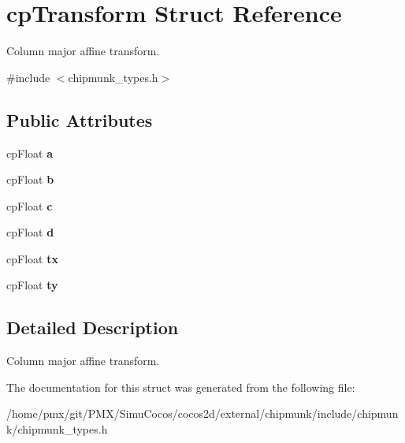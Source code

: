 \hypertarget{structcpTransform}{}\section{cp\+Transform Struct Reference}
\label{structcpTransform}


Column major affine transform.  




{\ttfamily \#include $<$chipmunk\+\_\+types.\+h$>$}

\subsection*{Public Attributes}
\begin{DoxyCompactItemize}
\item 
\mbox{\label{structcpTransform_a99065fbbead0a1df742987d5236f9fa0}} 
cp\+Float {\bfseries a}
\item 
\mbox{\label{structcpTransform_a86126f0cf307529a7faab06f7356a698}} 
cp\+Float {\bfseries b}
\item 
\mbox{\label{structcpTransform_ab0da955529cd2c48fe0aca3d4ff239a7}} 
cp\+Float {\bfseries c}
\item 
\mbox{\label{structcpTransform_a9ad9383b2b2d39d419cb9434f3d761b2}} 
cp\+Float {\bfseries d}
\item 
\mbox{\label{structcpTransform_ab96aaff15cc6eee33ebc02a9008e364d}} 
cp\+Float {\bfseries tx}
\item 
\mbox{\label{structcpTransform_a19248d1cb0123595538815db45ce81b1}} 
cp\+Float {\bfseries ty}
\end{DoxyCompactItemize}


\subsection{Detailed Description}
Column major affine transform. 

The documentation for this struct was generated from the following file\+:\begin{DoxyCompactItemize}
\item 
/home/pmx/git/\+P\+M\+X/\+Simu\+Cocos/cocos2d/external/chipmunk/include/chipmunk/chipmunk\+\_\+types.\+h\end{DoxyCompactItemize}

